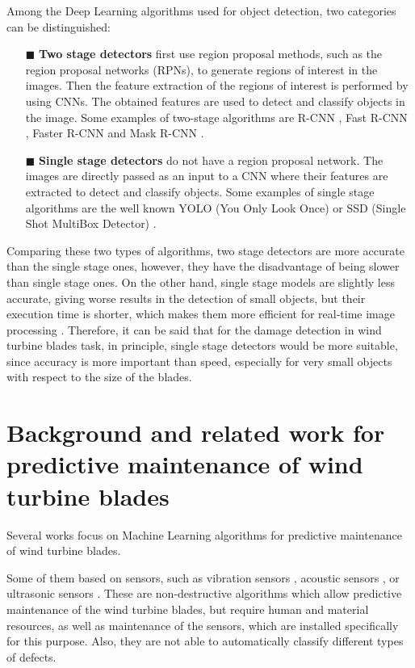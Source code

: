 Among the Deep Learning algorithms used for object detection, two categories can be distinguished:
\begin{itemize}[]
    \item[\tiny$\blacksquare$]\textbf{Two stage detectors} first use region proposal methods, such as the region proposal networks (RPNs), to generate regions of interest in the images. Then the feature extraction of the regions of interest is performed by using CNNs. The obtained features are used to detect and classify objects in the image. Some examples of two-stage algorithms are R-CNN \cite{girshick2014rcnn}, Fast R-CNN \cite{girshick2015fast}, Faster R-CNN \cite{ren2015faster} and Mask R-CNN \cite{he2017mask}.
    \item[\tiny$\blacksquare$] \textbf{Single stage detectors} do not have a region proposal network. The images are directly passed as an input to a CNN where their features are extracted to detect and classify objects. Some examples of single stage algorithms are the well known YOLO (You Only Look Once) \cite{redmon2016yolo} or SSD (Single Shot MultiBox Detector) \cite{lui2016ssd}.
\end{itemize}

Comparing these two types of algorithms, two stage detectors are more accurate than the single stage ones, however, they have the disadvantage of being slower than single stage ones. On the other hand, single stage models are slightly less accurate, giving worse results in the detection of small objects, but their execution time is shorter, which makes them more efficient for real-time image processing \cite{soviany2018tradeoff}. Therefore, it can be said that for the damage detection in wind turbine blades task, in principle, single stage detectors would be more suitable, since accuracy is more important than speed, especially for very small objects with respect to the size of the blades.


\section{Background and related work for predictive maintenance of wind turbine blades}
\label{sec:relatedWork}

Several works focus on Machine Learning algorithms for predictive maintenance of wind turbine blades. 

Some of them based on sensors, such as vibration sensors \cite{joshuva2017data}, acoustic sensors \cite{jialin2016acoustic} \cite{han2014damage,regan2017wind}, or ultrasonic sensors \cite{ruizhen2016progress,alfredo2019linear}. These are non-destructive algorithms which allow predictive maintenance of the wind turbine blades, but require human and material resources, as well as maintenance of the sensors, which are installed specifically for this purpose. Also, they are not able to automatically classify different types of defects.

